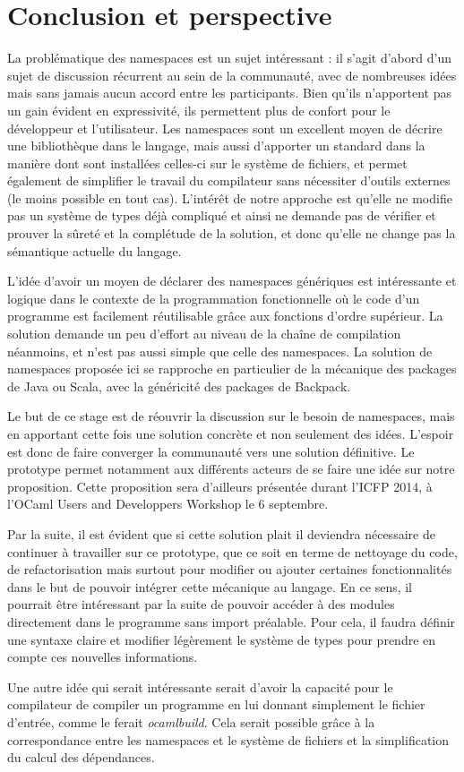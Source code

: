 \documentclass[11pt,a4paper]{report}
\begin{document}
\chapter{Conclusion et perspective}

La problématique des namespaces est un sujet intéressant : il s'agit d'abord
d'un sujet de discussion récurrent au sein de la communauté, avec de nombreuses
idées mais sans jamais aucun accord entre les participants. Bien qu'ils n'apportent
pas un gain évident en expressivité, ils permettent plus de confort pour le
développeur et l'utilisateur. Les namespaces sont un excellent moyen de décrire
une bibliothèque dans le langage, mais aussi d'apporter un standard dans la
manière dont sont installées celles-ci sur le système de fichiers, et permet
également de simplifier le travail du compilateur sans nécessiter d'outils
externes (le moins possible en tout cas). L'intérêt de notre approche est
qu'elle ne modifie pas un système de types déjà compliqué et ainsi ne demande
pas de vérifier et prouver la sûreté et la complétude de la solution, et donc
qu'elle ne change pas la sémantique actuelle du langage.

L'idée d'avoir un moyen de déclarer des namespaces génériques est intéressante
et logique dans le contexte de la programmation fonctionnelle où le code d'un
programme est facilement réutilisable grâce aux fonctions d'ordre supérieur. La
solution demande un peu d'effort au niveau de la chaîne de compilation
néanmoins, et n'est pas aussi simple que celle des namespaces. La solution de
namespaces proposée ici se rapproche en particulier de la mécanique des packages
de Java ou Scala, avec la généricité des packages de Backpack.

Le but de ce stage est de réouvrir la discussion sur le besoin de namespaces,
mais en apportant cette fois une solution concrète et non seulement des
idées. L'espoir est donc de faire converger la communauté vers une solution
définitive. Le prototype permet notamment aux différents acteurs de se faire une
idée sur notre proposition. Cette proposition sera d'ailleurs présentée durant
l'ICFP 2014, à l'OCaml Users and Developpers Workshop le 6 septembre.

Par la suite, il est évident que si cette solution plait il deviendra nécessaire
de continuer à travailler sur ce prototype, que ce soit en terme de nettoyage du
code, de refactorisation mais surtout pour modifier ou ajouter certaines
fonctionnalités dans le but de pouvoir intégrer cette mécanique au langage. En
ce sens, il pourrait être intéressant par la suite de pouvoir accéder à des
modules directement dans le programme sans import préalable. Pour cela, il
faudra définir une syntaxe claire et modifier légèrement le système de types
pour prendre en compte ces nouvelles informations.

Une autre idée qui serait intéressante serait d'avoir la capacité pour le
compilateur de compiler un programme en lui donnant simplement le fichier
d'entrée, comme le ferait \emph{ocamlbuild}. Cela serait possible grâce à la
correspondance entre les namespaces et le système de fichiers et la
simplification du calcul des dépendances.



\end{document}

